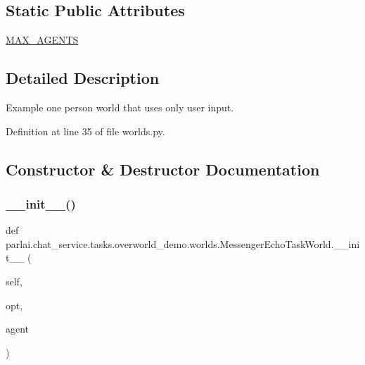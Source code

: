 \subsection*{Static Public Attributes}
\begin{DoxyCompactItemize}
\item 
\hyperlink{classparlai_1_1chat__service_1_1tasks_1_1overworld__demo_1_1worlds_1_1MessengerEchoTaskWorld_a5c39c68fabb3d7ffcabf02d40ba5c5e0}{M\+A\+X\+\_\+\+A\+G\+E\+N\+TS}
\end{DoxyCompactItemize}


\subsection{Detailed Description}
\begin{DoxyVerb}Example one person world that uses only user input.
\end{DoxyVerb}
 

Definition at line 35 of file worlds.\+py.



\subsection{Constructor \& Destructor Documentation}
\mbox{\label{classparlai_1_1chat__service_1_1tasks_1_1overworld__demo_1_1worlds_1_1MessengerEchoTaskWorld_aea9e37c8acd753234d74bbd6bde07870}} 
\subsubsection{\texorpdfstring{\+\_\+\+\_\+init\+\_\+\+\_\+()}{\_\_init\_\_()}}
{\footnotesize\ttfamily def parlai.\+chat\+\_\+service.\+tasks.\+overworld\+\_\+demo.\+worlds.\+Messenger\+Echo\+Task\+World.\+\_\+\+\_\+init\+\_\+\+\_\+ (\begin{DoxyParamCaption}\item[{}]{self,  }\item[{}]{opt,  }\item[{}]{agent }\end{DoxyParamCaption})}



